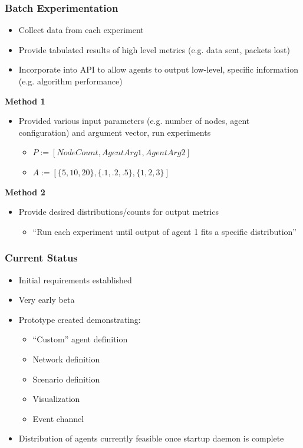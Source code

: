\documentclass[mathserif]{beamer}
\begin{document}
\frame
{
    \frametitle{Batch Experimentation}
    \begin{itemize}
        \item Collect data from each experiment
        \item Provide tabulated results of high level metrics (e.g. data sent, packets lost)
        \item Incorporate into API to allow agents to output low-level, specific information (e.g. algorithm
        performance)
    \end{itemize}
    \textbf{Method 1}
    \begin{itemize}
        \item Provided various input parameters (e.g. number of nodes, agent configuration) and argument vector, run
        experiments
        \begin{itemize}
            \item $P := [ NodeCount, AgentArg1, AgentArg2 ]$
            \item $A := [ \{5, 10, 20\}, \{.1, .2, .5\}, \{1, 2, 3\} ]$
        \end{itemize}
    \end{itemize}
    \textbf{Method 2}
    \begin{itemize}
        \item Provide desired distributions/counts for output metrics
        \begin{itemize}
            \item ``Run each experiment until output of agent 1 fits a specific distribution''
        \end{itemize}
    \end{itemize}
}

\frame
{
    \frametitle{Current Status}
    \begin{itemize}
	\item Initial requirements established
	\item Very early beta
	\item Prototype created demonstrating:
        \begin{itemize}
	    \item ``Custom'' agent definition
	    \item Network definition
	    \item Scenario definition
	    \item Visualization
	    \item Event channel
        \end{itemize}
    	\item Distribution of agents currently feasible once startup daemon is complete
    \end{itemize}
}
\end{document}
